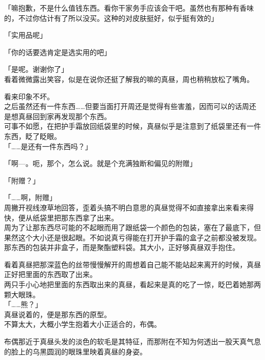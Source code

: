 「嘛抱歉，不是什么值钱东西。看你干家务手应该会干吧。虽然也有那种有香味的，不过你估计有了所以没买。这种的对皮肤挺好，似乎挺有效的」

「实用品呢」

「你的话要选肯定是选实用的吧」

「是呢。谢谢你了」\\

看着微微露出笑容，似是在说你还挺了解我的嘛的真昼，周也稍稍放松了嘴角。

看来印象不坏。\\

之后虽然还有一件东西……但要当面打开周还是觉得有些害羞，因而可以的话周还是想真昼回到家再发现那个东西。\\

可事不如愿，在把护手霜放回纸袋里的时候，真昼似乎是注意到了纸袋里还有一件东西，眨了眨眼。\\

「……是还有一件东西吗？」

「啊—。呃，那个，怎么说。就是个充满独断和偏见的附赠」

「附赠？」

「……啊，附赠」\\

周撇开视线潦草地回答，歪着头搞不明白意思的真昼觉得不如直接拿出来看来得快，便从纸袋里把那东西拿了出来。\\

周为了让那东西尽可能的不起眼而用了跟纸袋一个颜色的包装，塞在了最底下，但果然这个大小还是很起眼。不如说真亏得能在打开护手霜的盒子之前都没被发现。\\

那东西的包装并非盒子，而是聚酯塑料袋。其大小，正好够真昼双手抱住。

看着真昼把那深蓝色的丝带慢慢解开的周想着自己能不能站起来离开的时候，真昼正好把里面的东西取了出来。\\

两只手小心地把里面的东西取出来的真昼，看起来是真的吃了一惊，眨巴着她那两颗大眼珠。\\

「……熊？」\\

真昼说着的，便是那东西的原型。\\

不算太大，大概小学生抱着大小正适合的，布偶。

布偶那近于真昼头发的淡色的软毛是其特征，而那附在不知为何透出一股天真气息的脸上的乌黑圆润的眼珠里映着真昼的身姿。\\

